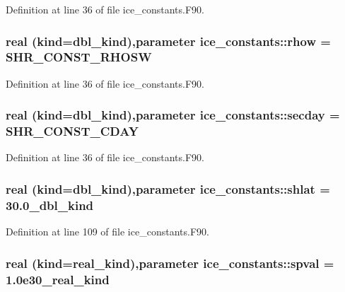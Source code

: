 Definition at line 36 of file ice\_\-constants.F90.\hypertarget{namespaceice__constants_a64fecf2ffd940ef72dbaa94c096930de}{
\subsubsection[{rhow}]{\setlength{\rightskip}{0pt plus 5cm}real (kind=dbl\_\-kind),parameter {\bf ice\_\-constants::rhow} = SHR\_\-CONST\_\-RHOSW}}
\label{namespaceice__constants_a64fecf2ffd940ef72dbaa94c096930de}


Definition at line 36 of file ice\_\-constants.F90.\hypertarget{namespaceice__constants_a4834c667201b1d05b8a0a0cf79b10742}{
\subsubsection[{secday}]{\setlength{\rightskip}{0pt plus 5cm}real (kind=dbl\_\-kind),parameter {\bf ice\_\-constants::secday} = SHR\_\-CONST\_\-CDAY}}
\label{namespaceice__constants_a4834c667201b1d05b8a0a0cf79b10742}


Definition at line 36 of file ice\_\-constants.F90.\hypertarget{namespaceice__constants_a899f02a446bdd286d3047a7bd80f6dec}{
\subsubsection[{shlat}]{\setlength{\rightskip}{0pt plus 5cm}real (kind=dbl\_\-kind),parameter {\bf ice\_\-constants::shlat} = 30.0\_\-dbl\_\-kind}}
\label{namespaceice__constants_a899f02a446bdd286d3047a7bd80f6dec}


Definition at line 109 of file ice\_\-constants.F90.\hypertarget{namespaceice__constants_a9c8695ae78220caf5148da03217658d9}{
\subsubsection[{spval}]{\setlength{\rightskip}{0pt plus 5cm}real (kind=real\_\-kind),parameter {\bf ice\_\-constants::spval} = 1.0e30\_\-real\_\-kind}}
\label{namespaceice__constants_a9c8695ae78220caf5148da03217658d9}


